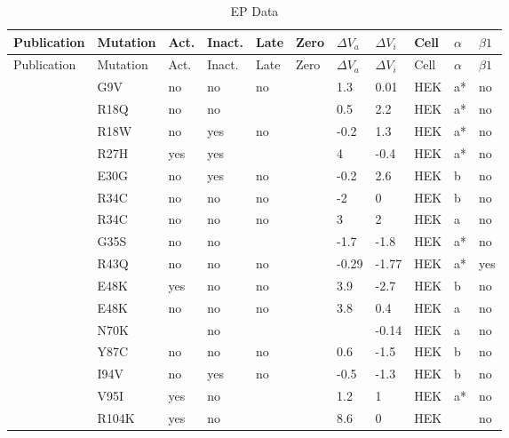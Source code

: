 \begin{tiny}
\startrowcolors
\begin{longtable}{p{4cm}|l|llll|ll|lll}
\caption{\label{tab:epdata}EP Data} \\
\hline
Publication & Mutation & Act. & Inact. & Late & Zero & ${\Delta}V_a$ & ${\Delta}V_i$ & Cell & $\alpha$ & $\beta1$ \\
\hline
\endfirsthead\hline
\rowcolor{white}
Publication & Mutation & Act. & Inact. & Late & Zero & ${\Delta}V_a$ & ${\Delta}V_i$ & Cell & $\alpha$ & $\beta1$ \\
\hline
\endhead
\hline
\endfoot
\citet{Guetter2013MutationDB} & G9V & no & no & no &  & 1.3 & 0.01 & HEK & a* & no \\
\citet{Guetter2013MutationDB} & R18Q & no & no &  &  & 0.5 & 2.2 & HEK & a* & no \\
\citet{Guetter2013MutationDB} & R18W & no & yes & no &  & -0.2 & 1.3 & HEK & a* & no \\
\citet{Guetter2013MutationDB} & R27H & yes & yes &  &  & 4 & -0.4 & HEK & a* & no \\
\citet{Kapplinger2015MutationDB} & E30G & no & yes & no &  & -0.2 & 2.6 & HEK & b & no \\
\citet{Tan2005MutationDB} & R34C & no & no & no &  & -2 & 0 & HEK & b & no \\
\citet{Tan2005MutationDB} & R34C & no & no & no &  & 3 & 2 & HEK & a & no \\
\citet{Guetter2013MutationDB} & G35S & no & no &  &  & -1.7 & -1.8 & HEK & a* & no \\
\citet{Lin2008MutationDB} & R43Q & no & no & no &  & -0.29 & -1.77 & HEK & a* & yes \\
\citet{Kapplinger2015MutationDB} & E48K & yes & no & no &  & 3.9 & -2.7 & HEK & b & no \\
\citet{Kapplinger2015MutationDB} & E48K & no & no & no &  & 3.8 & 0.4 & HEK & a & no \\
\citet{Hoshi2014MutationDB} & N70K &  & no &  &  &  & -0.14 & HEK & a & no \\
\citet{Kapplinger2015MutationDB} & Y87C & no & no & no &  & 0.6 & -1.5 & HEK & b & no \\
\citet{Beyder2014MutationDB} & I94V & no & yes & no &  & -0.5 & -1.3 & HEK & b & no \\
\citet{Guetter2013MutationDB} & V95I & yes & no &  &  & 1.2 & 1 & HEK & a* & no \\
\citet{Clatot2012MutationDB} & R104K & yes & no &  &  & 8.6 & 0 & HEK &  & no \\

\end{longtable}
\end{tiny}
